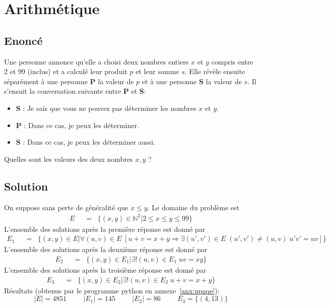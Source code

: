 \documentclass{article}
\newcommand{\eqnsymb}[1]{\;\;{#1}\;\;}
\newenvironment{statement}{\subsection{Enoncé}}{\pagebreak}
\newenvironment{solution}{\subsection{Solution}}{\pagebreak}
\begin{document}
\section{Arithmétique}
\label{sec:upaqe}
\begin{statement}
Une personne annonce qu'elle a choisi deux nombres entiers $x$ et $y$ compris entre $2$ et $99$ (inclus) et a calculé leur produit $p$ et leur somme $s$. Elle révèle ensuite séparément à une personne {\bf P} la valeur de $p$ et à une personne {\bf S} la valeur de $s$. Il s’ensuit la conversation suivante entre {\bf P} et {\bf S}:
\begin{itemize}
\item {\bf S} : Je sais que vous ne pouvez pas déterminer les nombres $x$ et $y$.
\item {\bf P} : Dans ce cas, je peux les déterminer.
\item {\bf S} : Dans ce cas, je peux les déterminer aussi.
\end{itemize}
Quelles sont les valeurs des deux nombres $x,y$ ?
\end{statement}
\begin{solution}
On suppose sans perte de généralité que $x\leq y$. Le domaine du problème est
\begin{align*}
E & \eqnsymb{=} \{(x,y)\in\mathbb{N}^2|2\leq x\leq y\leq 99\}
\end{align*}
L'ensemble des solutions après la première réponse est donné par
\begin{align*}
E_1 & \eqnsymb{=} \{(x,y)\in E|\forall(u,v)\in E\;[u+v=x+y\Rightarrow\exists(u',v')\in E\;(u',v')\not=(u,v)\; u'v'=uv] \}
\end{align*}
L'ensemble des solutions après la deuxième réponse est donné par
\begin{align*}
E_2 & \eqnsymb{=} \{(x,y)\in E_1|\exists! (u,v)\in E_1\;uv=xy\}
\end{align*}
L'ensemble des solutions après la troisième réponse est donné par
\begin{align*}
E_3 & \eqnsymb{=} \{(x,y)\in E_2|\exists! (u,v)\in E_2\;u+v=x+y\}
\end{align*}
Résultats (obtenus par le programme python en annexe~\ref{anx:upaqe}):
\[
|E| = 4851
\hspace{1cm}
|E_1| = 145
\hspace{1cm}
|E_2| = 86
\hspace{1cm}
E_3 = \{(4,13)\}
\]
\end{solution}
\end{document}
